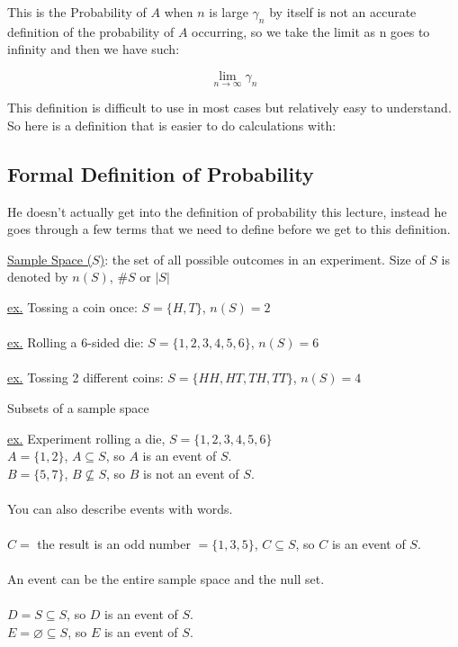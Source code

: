 \documentclass[12pt]{article}
\begin{document}
This is the Probability of $A$ when $n$ is large $\gamma_n$ by itself is not an accurate definition of the probability of $A$ occurring, so we take the limit as n goes to infinity and then we have such:

$$\lim_{n\to\infty} \gamma_n$$

This definition is difficult to use in most cases but relatively easy to understand. So here is a definition that is easier to do calculations with:

\subsection{Formal Definition of Probability}

He doesn't actually get into the definition of probability this lecture, instead he goes through a few terms that we need to define before we get to this definition.



	\begin{tcolorbox}[title=Sample Space ($S$)]
	\underline{Sample Space ($S$)}: the set of all possible outcomes in an experiment. Size of $S$ is denoted by $n(S)$, $\#S$ or $|S|$
	\end{tcolorbox}
	\underline{ex.} Tossing a coin once: $S = \{ H,T \}$, $n(S) = 2$\\
	\\
	\underline{ex.} Rolling a 6-sided die: $S = \{ 1,2,3,4,5,6 \}$, $n(S) = 6$\\
	\\
	\underline{ex.} Tossing 2 different coins: $S = \{ HH, HT, TH, TT \}$, $n(S) = 4$


	\begin{tcolorbox}[title=Events] Subsets of a sample space
	\end{tcolorbox}
	\underline{ex.} Experiment rolling a die, $S = \{ 1,2,3,4,5,6 \}$\\
	$A = \{ 1,2 \}$, $A \subseteq S$, so $A$ is an event of $S$.\\
	$B = \{ 5,7 \}$, $B \nsubseteq S$, so $B$ is not an event of $S$.\\
	\\
	You can also describe events with words.\\
	\\
	$C =$ the result is an odd number $= \{ 1,3,5 \}$, $C \subseteq S$, so $C$ is an event of $S$.\\
	\\
	An event can be the entire sample space and the null set.\\
	\\
	$D = S \subseteq S$, so $D$ is an event of $S$.\\
	$E = \varnothing \subseteq S$, so $E$ is an event of $S$.\\
\end{document}
